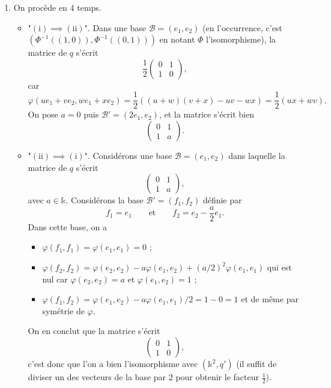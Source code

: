 \documentclass{../../td}
\begin{document}
  \begin{enumerate}
    \item \label{ex3-q1}
      On procède en 4 temps.
      \begin{itemize}
        \item "$(\text{i}) \implies (\text{ii})$". Dans une base $\mathcal{B} = (e_1, e_2)$ (en l'occurrence, c'est $(\Phi^{-1}((1, 0)), \Phi ^{-1}((0,1)))$ en notant $\Phi$ l'isomorphisme), la matrice de $q$ s'écrit \[
              \frac{1}{2}\begin{pmatrix} 0 & 1\\ 1 & 0 \end{pmatrix} 
          ,\]
          car \[
          \varphi(u e_1 + v e_2, w e_1 + x e_2) = \frac{1}{2} ((u + w)(v + x) - uv - wx) = \frac{1}{2}(ux + wv)
          .\] 
          On pose $a = 0$ puis $\mathcal{B}' = (2 e_1, e_2)$, et la matrice s'écrit bien \[
            \begin{pmatrix} 0 & 1\\ 1 & a \end{pmatrix} 
          .\]
        \item "$(\text{ii}) \implies (\text{i})$".
          Considérons une base $\mathcal{B} = (e_1, e_2)$ dans laquelle la matrice de $q$ s'écrit \[
            \begin{pmatrix} 0 & 1\\ 1 & a \end{pmatrix} 
          ,\] avec $a \in \mathds{k}$.
          Considérons la base $\mathcal{B}' = (f_1, f_2)$ définie par \[
          f_1 = e_1 \quad\quad \text{et} \quad\quad f_2 = e_2 - \frac{a}{2} e_1
          .\] Dans cette base, on a 
          \begin{itemize}
            \item $\varphi(f_1,f_1) = \varphi(e_1, e_1) = 0$ ;
            \item $\varphi(f_2, f_2) = \varphi(e_2, e_2) - a \varphi(e_1, e_2) + (a / 2)^2 \varphi(e_1, e_1)$ qui est nul car $\varphi(e_2, e_2) = a$ et $\varphi(e_1, e_2) = 1$ ;
            \item $\varphi(f_1, f_2) = \varphi(e_1, e_2) - a \varphi(e_1, e_1) / 2 = 1 - 0 = 1$ et de même par symétrie de $\varphi$.
          \end{itemize}
          On en conclut que la matrice s'écrit \[
            \begin{pmatrix} 0 & 1\\ 1 & 0 \end{pmatrix} 
          ,\] c'est donc que l'on a bien l'isomorphisme avec $(\mathds{k}^2, q')$ (il suffit de diviser un des vecteurs de la base par $2$ pour obtenir le facteur $\frac{1}{2}$).

\end{itemize}
\end{enumerate}
\end{document}
